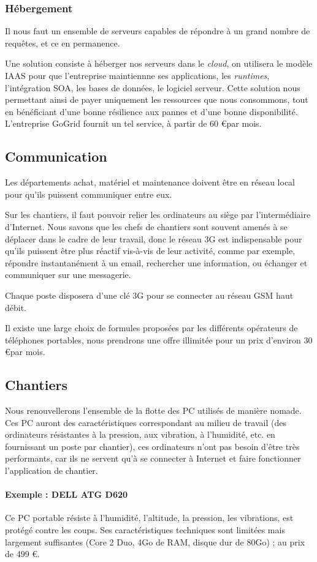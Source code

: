 	\subsubsection{Hébergement}
    Il nous faut un ensemble de serveurs capables de répondre à un grand
    nombre de requêtes, et ce en permanence.

Une solution consiste à héberger nos serveurs dans le \textsl{cloud}, on
utilisera le modèle IAAS pour  que l'entreprise maintiennne ses applications,
les {\sl runtimes}, l'intégration SOA, les bases de données, le logiciel
serveur.  Cette solution nous permettant ainsi de payer uniquement les
ressources que nous consommons, tout en bénéficiant d'une bonne résilience
aux pannes et d'une bonne disponibilité.  L'entreprise GoGrid fournit un
tel service, à partir de 60 \euro par mois.


\subsection{Communication}
Les départements achat, matériel et maintenance doivent être en réseau local
pour qu'ils puissent  communiquer entre eux.

Sur les chantiers, il faut pouvoir relier les ordinateurs au siège par
l'intermédiaire d'Internet.  Nous savons que les chefs de chantiers sont
souvent amenés à se déplacer dans le cadre de leur travail, donc le réseau
3G est indispensable pour qu'ils puissent être plus réactif vis-à-vis de
leur activité, comme par exemple, répondre instantanément à un email,
rechercher une information, ou échanger et communiquer sur une messagerie. 

Chaque poste disposera d’une clé 3G pour se connecter au réseau GSM haut
débit.

Il existe une large choix de formules proposées par les différents
opérateurs de téléphones portables, nous prendrons une offre illimitée pour un prix 
d'environ 30 \euro par mois.

\subsection{Chantiers}

Nous renouvellerons l'ensemble de la flotte des PC utilisés de manière nomade.
Ces PC auront des caractéristiques correspondant au milieu de
travail (des ordinateurs résistantes à la pression, aux vibration, à
l'humidité, etc.  en fournissant un poste par chantier), ces ordinateurs
n'ont pas besoin d’être très performants, car ils ne servent qu'à se
connecter à Internet et faire fonctionner l'application de chantier.

\paragraph{Exemple : DELL ATG D620}
Ce PC portable résiste à l'humidité, l'altitude,
la pression, les vibrations, est protégé contre les coups.
Ses caractéristiques techniques sont limitées mais largement suffisantes
(Core 2 Duo, 4Go de RAM, disque dur de 80Go) ; au prix de 499 \euro.
